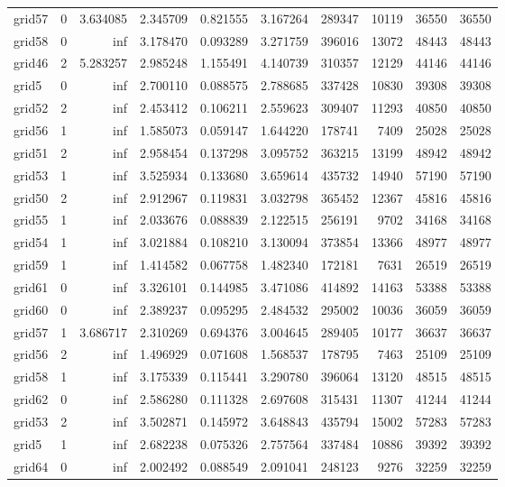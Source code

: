 \begin{longtable}{|l|r|r|r|r|r|r|r|r|r|}
grid57 & 0 & 3.634085 & 2.345709 & 0.821555 & 3.167264 & 289347 & 10119 & 36550 & 36550 \\
grid58 & 0 & inf & 3.178470 & 0.093289 & 3.271759 & 396016 & 13072 & 48443 & 48443 \\
grid46 & 2 & 5.283257 & 2.985248 & 1.155491 & 4.140739 & 310357 & 12129 & 44146 & 44146 \\
grid5 & 0 & inf & 2.700110 & 0.088575 & 2.788685 & 337428 & 10830 & 39308 & 39308 \\
grid52 & 2 & inf & 2.453412 & 0.106211 & 2.559623 & 309407 & 11293 & 40850 & 40850 \\
grid56 & 1 & inf & 1.585073 & 0.059147 & 1.644220 & 178741 & 7409 & 25028 & 25028 \\
grid51 & 2 & inf & 2.958454 & 0.137298 & 3.095752 & 363215 & 13199 & 48942 & 48942 \\
grid53 & 1 & inf & 3.525934 & 0.133680 & 3.659614 & 435732 & 14940 & 57190 & 57190 \\
grid50 & 2 & inf & 2.912967 & 0.119831 & 3.032798 & 365452 & 12367 & 45816 & 45816 \\
grid55 & 1 & inf & 2.033676 & 0.088839 & 2.122515 & 256191 & 9702 & 34168 & 34168 \\
grid54 & 1 & inf & 3.021884 & 0.108210 & 3.130094 & 373854 & 13366 & 48977 & 48977 \\
grid59 & 1 & inf & 1.414582 & 0.067758 & 1.482340 & 172181 & 7631 & 26519 & 26519 \\
grid61 & 0 & inf & 3.326101 & 0.144985 & 3.471086 & 414892 & 14163 & 53388 & 53388 \\
grid60 & 0 & inf & 2.389237 & 0.095295 & 2.484532 & 295002 & 10036 & 36059 & 36059 \\
grid57 & 1 & 3.686717 & 2.310269 & 0.694376 & 3.004645 & 289405 & 10177 & 36637 & 36637 \\
grid56 & 2 & inf & 1.496929 & 0.071608 & 1.568537 & 178795 & 7463 & 25109 & 25109 \\
grid58 & 1 & inf & 3.175339 & 0.115441 & 3.290780 & 396064 & 13120 & 48515 & 48515 \\
grid62 & 0 & inf & 2.586280 & 0.111328 & 2.697608 & 315431 & 11307 & 41244 & 41244 \\
grid53 & 2 & inf & 3.502871 & 0.145972 & 3.648843 & 435794 & 15002 & 57283 & 57283 \\
grid5 & 1 & inf & 2.682238 & 0.075326 & 2.757564 & 337484 & 10886 & 39392 & 39392 \\
grid64 & 0 & inf & 2.002492 & 0.088549 & 2.091041 & 248123 & 9276 & 32259 & 32259 \\

\end{longtable}

